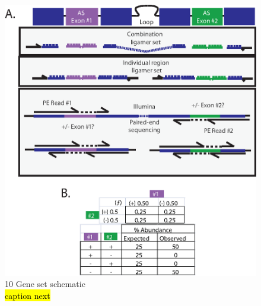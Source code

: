 \begin{figure}[htbp]
	\centering 
	\includegraphics{Figures/Chapter2/10GeneSetSchematic.eps}
	\caption[10 Gene Set schematic]
	{
		10 Gene set schematic\\
		\hl{caption next}
	}
	\label{fig:Original SeqZip Diagram}
\end{figure}

